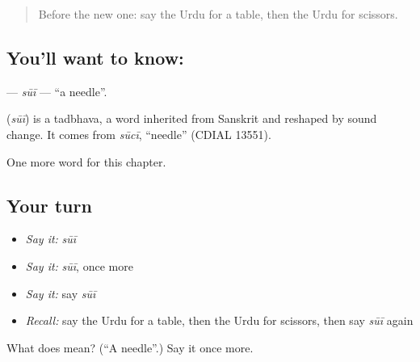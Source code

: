 \label{lesson:UR-C105-sui}



\begin{quote}
Before the new one: say the Urdu for a table, then the Urdu for scissors.
\end{quote}

\subsection*{You'll want to know: }
\textbf{} — \emph{sūī} — \textquotedblleft{}a needle\textquotedblright{}.

\begin{cousinweb}
\textbf{} (\emph{sūī}) is a tadbhava, a word inherited from Sanskrit and reshaped by sound change. It comes from \emph{sūcī}, \textquotedblleft{}needle\textquotedblright{} (CDIAL 13551).
\end{cousinweb}

\begin{grammarlens}[title={What you've built}]
One more word for this chapter.
\end{grammarlens}

\subsection*{Your turn}
\begin{itemize}
\raggedright
  \item \emph{Say it:} \emph{sūī}
  \item \emph{Say it:} \emph{sūī}, once more
  \item \emph{Say it:} say \emph{sūī}
  \item \emph{Recall:} say the Urdu for a table, then the Urdu for scissors, then say \emph{sūī} again
\end{itemize}

\begin{tcolorbox}[breakable,colback=teal!4,colframe=teal!35!black,title={Before you move on}]
What does  mean? (\textquotedblleft{}A needle\textquotedblright{}.) Say it once more.
\end{tcolorbox}

